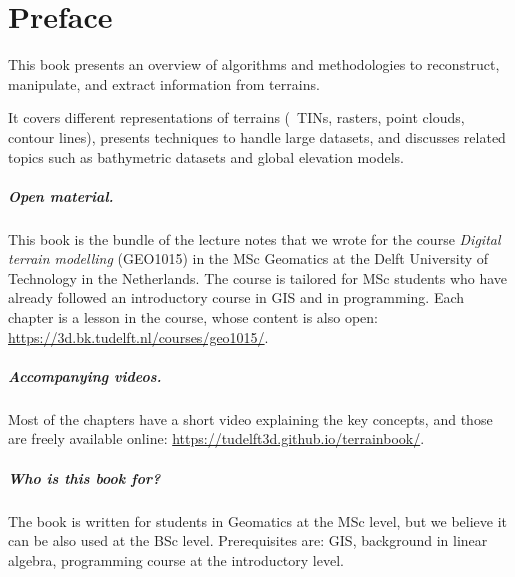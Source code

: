 


\chapter*{Preface}

This book presents an overview of algorithms and methodologies to reconstruct, manipulate, and extract information from terrains.

It covers different representations of terrains (\eg\ TINs, rasters, point clouds, contour lines), presents techniques to handle large datasets, and discusses related topics such as bathymetric datasets and global elevation models.



\paragraph*{Open material.}
This book is the bundle of the lecture notes that we wrote for the course \emph{Digital terrain modelling} (GEO1015) in the MSc Geomatics at the Delft University of Technology in the Netherlands.
The course is tailored for MSc students who have already followed an introductory course in GIS and in programming.
Each chapter is a lesson in the course, whose content is also open: \url{https://3d.bk.tudelft.nl/courses/geo1015/}.


\paragraph*{Accompanying videos.}
Most of the chapters have a short video explaining the key concepts, and those are freely available online: \url{https://tudelft3d.github.io/terrainbook/}.


\paragraph*{Who is this book for?}
The book is written for students in Geomatics at the MSc level, but we believe it can be also used at the BSc level.
Prerequisites are: GIS, background in linear algebra, programming course at the introductory level.


